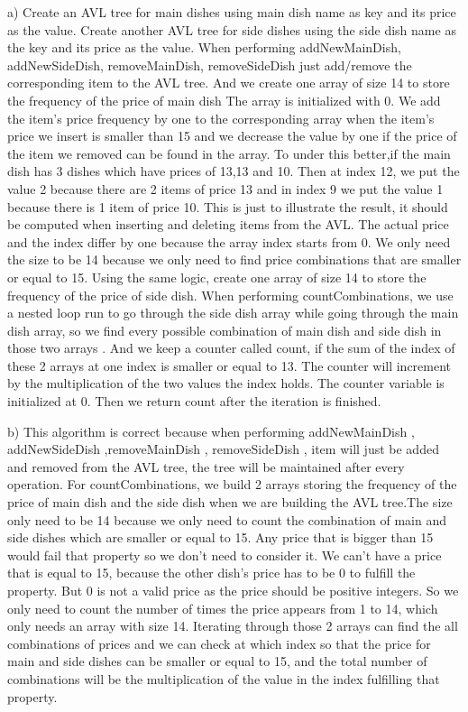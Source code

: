 \documentclass[12pt]{article}
\begin{document}
a) Create an AVL tree for main dishes using main dish name as key and its price as the value. Create another AVL tree for side dishes using the side dish name as the key and its price as the value. When performing addNewMainDish, addNewSideDish, removeMainDish, removeSideDish just add/remove the corresponding item to the AVL tree. And we create one array of size 14 to store the frequency of the price of main dish The array is initialized with 0.  We add the item's price frequency by one to the corresponding array when the item's price we insert is smaller than 15 and we decrease the value by one if the price of the item we removed can be found in the array. To under this better,if the main dish has 3 dishes which have prices of 13,13 and 10. Then at index 12, we put the value 2 because there are 2 items of price 13 and in index 9 we put the value 1 because there is 1 item of price 10. This is just to illustrate the result, it should be computed when inserting and deleting items from the AVL. The actual price and the index differ by one because the array index starts from 0. We only need the size to be 14 because we only need to find price combinations that are smaller or equal to 15. Using the same logic, create one array of size 14 to store the frequency of the price of side dish. When performing countCombinations, we use a nested loop run to go through the side dish array while going through the main dish array, so we find every possible combination of main dish and side dish in those two arrays . And we keep a counter called count, if the sum of the index of these 2 arrays at one index is smaller or equal to 13. The counter will increment by the multiplication of the two values the index holds. The counter variable is initialized at 0. Then we return count after the iteration is finished.




b) 
This algorithm is correct because when performing addNewMainDish , \\
addNewSideDish ,removeMainDish , removeSideDish , item will just be added and removed from the AVL tree, the tree will be maintained after every operation. For countCombinations, we build 2 arrays storing the frequency of the price of main dish and the side dish when we are building the AVL tree.The size only need to be 14 because we only need to count the combination of main and side dishes which are smaller or equal to 15. Any price that is bigger than 15 would fail that property so we don't need to consider it. We can't have a price that is equal to 15, because the other dish's price has to be 0 to fulfill the property. But 0 is not a valid price as the price should be positive integers. So we only need to count the number of times the price appears from 1 to 14, which only needs an array with size 14. Iterating through those 2 arrays can find the all combinations of prices and we can check at which index so that the price for main and side dishes can be smaller or equal to 15, and the total number of combinations will be the multiplication of the value in the index fulfilling that property.
\end{document}
